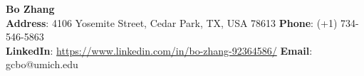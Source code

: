 \documentclass[12pt]{res}
\newcommand{\style}[1]{\color{Blue}\large\textsc{#1}}
\begin{document}
\begin{center}
\vspace{-3cm}

\textbf{\LARGE Bo Zhang}\\
\vspace{-1.0mm}
\hspace{-1.35cm}
{\indent \bf Address}: 4106 Yosemite Street, Cedar Park,  TX, USA 78613 \hfill {\bf Phone}: (+1) 734-546-5863\\
\vspace{-1.2mm}
\hspace{-1.35cm}
{\indent \bf LinkedIn}: {\color{Blue}\url{https://www.linkedin.com/in/bo-zhang-92364586/}} \hfill {\bf Email}: gcbo@umich.edu\\
\end{center}


\begin{resume}


\vspace{-35pt}


\end{resume}
\end{document}

